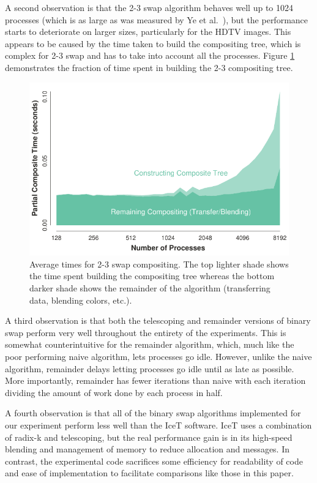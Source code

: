 \documentclass{vgtc}                          %
\newcommand*{\scite}[1]{~\cite{#1}}
\newcommand{\textalgorithm}[1]{\textsf{#1}\xspace}
\newcommand{\binaryswap}{\textalgorithm{binary swap}}
\newcommand{\ttswap}{\textalgorithm{2-3 swap}}
\newcommand{\naive}{\textalgorithm{naive}}
\newcommand{\telescoping}{\textalgorithm{telescoping}}
\newcommand{\remainder}{\textalgorithm{remainder}}
\newcommand{\radixk}{\textalgorithm{radix-k}}
\begin{document}
A second observation is that the \ttswap algorithm behaves well up to 1024 processes (which is as large as was measured by Ye et al.\scite{23Swap}), but the performance starts to deteriorate on larger sizes, particularly for the HDTV images.
This appears to be caused by the time taken to build the compositing tree, which is complex for \ttswap and has to take into account all the processes.
Figure \ref{fig:23SwapOverhead} demonstrates the fraction of time spent in building the 2-3 compositing tree.

\begin{figure}[htb]
  \centering
  \includegraphics[width=\linewidth]{2-3-swap-overhead}
  \caption{
    Average times for \ttswap compositing.
    The top lighter shade shows the time spent building the compositing tree whereas the bottom darker shade shows the remainder of the algorithm (transferring data, blending colors, etc.).
  }
  \label{fig:23SwapOverhead}
\end{figure}

A third observation is that both the \telescoping and \remainder versions of binary swap perform very well throughout the entirety of the experiments.
This is somewhat counterintuitive for the \remainder algorithm, which, much like the poor performing \naive algorithm, lets processes go idle.
However, unlike the \naive algorithm, \remainder delays letting processes go idle until as late as possible.
More importantly, \remainder has fewer iterations than \naive with each iteration dividing the amount of work done by each process in half.

A fourth observation is that all of the \binaryswap algorithms implemented for our experiment perform less well than the IceT software.
IceT uses a combination of \radixk and \telescoping, but the real performance gain is in its high-speed blending and management of memory to reduce allocation and messages.
In contrast, the experimental code sacrifices some efficiency for readability of code and ease of implementation to facilitate comparisons like those in this paper.
\end{document}
